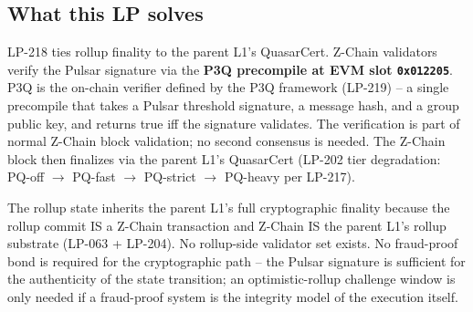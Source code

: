 \subsection{What this LP solves}

LP-218 ties rollup finality to the parent L1's QuasarCert. Z-Chain
validators verify the Pulsar signature via the \textbf{P3Q
precompile at EVM slot \texttt{0x012205}}. P3Q is the on-chain
verifier defined by the P3Q framework (LP-219) -- a single precompile
that takes a Pulsar threshold signature, a message hash, and a
group public key, and returns true iff the signature validates.
The verification is part of normal Z-Chain block validation; no
second consensus is needed. The Z-Chain block then finalizes via
the parent L1's QuasarCert (LP-202 tier degradation: PQ-off $\to$
PQ-fast $\to$ PQ-strict $\to$ PQ-heavy per LP-217).

The rollup state inherits the parent L1's full cryptographic
finality because the rollup commit IS a Z-Chain transaction and
Z-Chain IS the parent L1's rollup substrate (LP-063 + LP-204). No
rollup-side validator set exists. No fraud-proof bond is required
for the cryptographic path -- the Pulsar signature is sufficient
for the authenticity of the state transition; an optimistic-rollup
challenge window is only needed if a fraud-proof system is the
integrity model of the execution itself.
